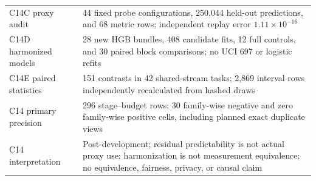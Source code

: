 \documentclass[education,supfile,submit,moreauthors]{Definitions/mdpi}
\begin{document}
\begin{table}[H]
\begin{tabularx}{\textwidth}{>{\raggedright\arraybackslash}p{} X}
C14C proxy audit & 44 fixed probe configurations, 250,044 held-out predictions, and 68 metric rows; independent replay error $1.11\times10^{-16}$ \\
C14D harmonized models & 28 new HGB bundles, 408 candidate fits, 12 full controls, and 30 paired block comparisons; no UCI 697 or logistic refits \\
C14E paired statistics & 151 contrasts in 42 shared-stream tasks; 2,869 interval rows independently recalculated from hashed draws \\
C14 primary precision & 296 stage--budget rows; 30 family-wise negative and zero family-wise positive cells, including planned exact duplicate views \\
C14 interpretation & Post-development; residual predictability is not actual proxy use; harmonization is not measurement equivalence; no equivalence, fairness, privacy, or causal claim \\
\bottomrule
\end{tabularx}
\end{table}
\FloatBarrier
\end{document}
